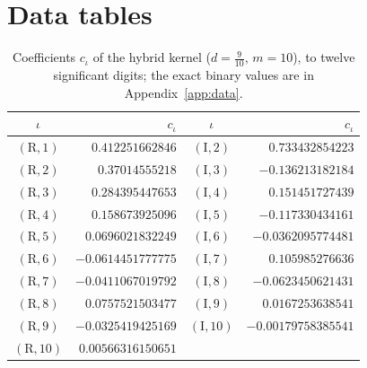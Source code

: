 \documentclass[11pt,reqno]{amsart}
\numberwithin{equation}{section}
\theoremstyle{definition}
\theoremstyle{remark}
\begin{document}
\section{Data tables}\label{app:tables}
\begin{table}[ht]\centering\small
\begin{tabular}{@{}cr@{\quad}cr@{}}\toprule $\iota$ & $c_\iota$ & $\iota$ & $c_\iota$\\\midrule
$(\mathrm R,1)$ & $0.412251662846$ & $(\mathrm I,2)$ & $0.733432854223$\\
$(\mathrm R,2)$ & $0.37014555218$ & $(\mathrm I,3)$ & $-0.136213182184$\\
$(\mathrm R,3)$ & $0.284395447653$ & $(\mathrm I,4)$ & $0.151451727439$\\
$(\mathrm R,4)$ & $0.158673925096$ & $(\mathrm I,5)$ & $-0.117330434161$\\
$(\mathrm R,5)$ & $0.0696021832249$ & $(\mathrm I,6)$ & $-0.0362095774481$\\
$(\mathrm R,6)$ & $-0.0614451777775$ & $(\mathrm I,7)$ & $0.105985276636$\\
$(\mathrm R,7)$ & $-0.0411067019792$ & $(\mathrm I,8)$ & $-0.0623450621431$\\
$(\mathrm R,8)$ & $0.0757521503477$ & $(\mathrm I,9)$ & $0.0167253638541$\\
$(\mathrm R,9)$ & $-0.0325419425169$ & $(\mathrm I,10)$ & $-0.00179758385541$\\
$(\mathrm R,10)$ & $0.00566316150651$ & & \\
\bottomrule\end{tabular}
\caption{Coefficients $c_\iota$ of the hybrid kernel ($d=\frac9{10}$, $m=10$), to twelve significant digits; the exact binary values are in Appendix~\ref{app:data}.}\label{tab:hybrid_kernel}\end{table}
\end{document}
